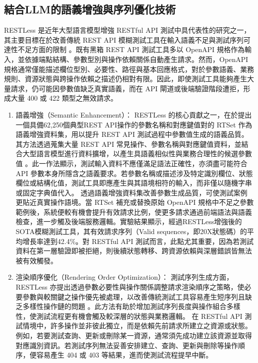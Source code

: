 \begin{ZhChapter}
\section{結合LLM的語義增強與序列優化技術}
\text RESTLess 是近年大型語言模型增強 RESTful API 測試中具代表性的研究之一，其主要目標在於改善傳統 REST API 模糊測試工具在輸入語義不足與測試序列可達性不足方面的限制 \parencite{Zheng2024RESTLess}。既有黑箱 REST API 測試工具多以 OpenAPI 規格作為輸入，並依據端點結構、參數型別與操作依賴關係自動產生請求。然而，OpenAPI 規格通常僅能描述欄位型別、必要性、路徑與基本回應格式，對於參數語義、業務規則、資源狀態與跨操作依賴之描述仍相對有限。因此，即使測試工具能夠產生大量請求，仍可能因參數值缺乏真實語義，而在 API 閘道或後端驗證階段遭拒，形成大量 400 或 422 類型之無效請求。
\begin{enumerate}
    \item 語義增強（Semantic Enhancement）：
    \text RESTLess 的核心貢獻之一，在於提出一個具備62,250個典型REST API操作的參數名稱和對應鍵值對的 RTSet 作為語義增強資料集，用以提升 REST API 測試過程中參數值生成的語義品質。其方法透過蒐集大量 REST API 常見操作、參數名稱與對應鍵值資料，並結合大型語言模型進行資料擴增，以產生具語義相似性與業務合理性的候選參數值 \parencite{Zheng2024RESTLess}。此一作法顯示，測試輸入資料不應僅滿足語法正確性，亦須盡可能符合 API 參數本身所隱含之語義要求。若參數名稱或描述涉及特定識別欄位、狀態欄位或結構化值，測試工具即應產生與其語境相符的輸入，而非僅以隨機字串或固定字典值代入。
    \text 透過語義增強資料集改善參數生成品質，可使測試案例更貼近真實操作語境。當 RTSet 補充或替換原始 OpenAPI 規格中不足之參數範例後，系統便較有機會提升有效請求比例，使更多請求通過前端語法與語義檢查，進一步觸及後端服務邏輯。實驗結果顯示，經過RESTLess增強後的SOTA模糊測試工具，其有效請求序列（Valid sequences，即20X狀態碼）的平均增長率達到42.4\%。對 RESTful API 測試而言，此點尤其重要，因為若測試資料在第一層驗證即被拒絕，則後續狀態轉移、跨資源依賴與深層錯誤皆無法被有效觸發。
    \item 渲染順序優化（Rendering Order Optimization）：
    \text 測試序列生成方面，RESTLess 亦提出透過參數必要性與操作關係調整請求渲染順序之策略，使必要參數與較關鍵之操作優先被處理，以改善傳統測試工具容易產生短序列且缺乏多樣性操作鏈的問題 \parencite{Zheng2024RESTLess}。此方法有助於增加測試序列長度與操作組合多樣性，使測試流程更有機會觸及較深層的狀態與業務邏輯。
    \text 在 RESTful API 測試情境中，許多操作並非彼此獨立，而是依賴先前請求所建立之資源或狀態。例如，若要測試查詢、更新或刪除某一資源，通常須先成功建立該資源並取得對應識別資訊。若測試序列無法妥善安排建立、查詢、更新與刪除等操作順序，便容易產生 404 或 403 等結果，進而使測試流程提早中斷。

\end{enumerate}
\end{ZhChapter}
